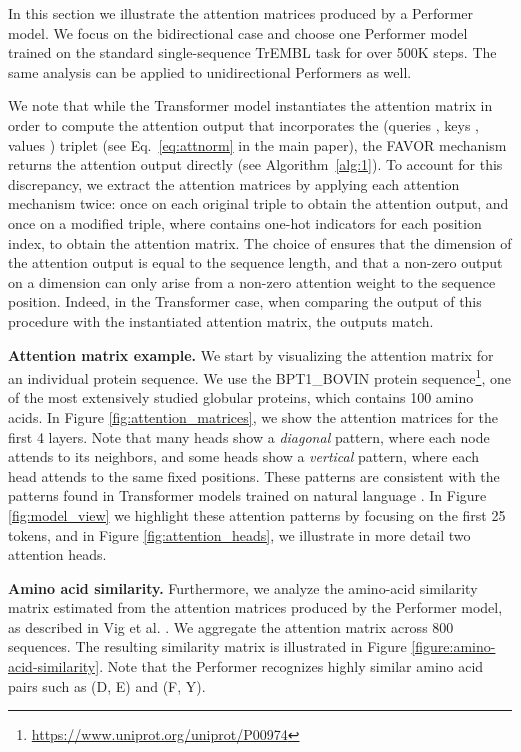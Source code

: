 In this section we illustrate the attention matrices produced by a Performer model. We focus on the bidirectional case and choose one Performer model trained on the standard single-sequence TrEMBL task for over 500K steps. The same analysis can be applied to unidirectional Performers as well.

We note that while the Transformer model instantiates the attention matrix in order to compute the attention output that incorporates the (queries , keys , values ) triplet (see Eq.~\ref{eq:attnorm} in the main paper), the FAVOR mechanism returns the attention output directly (see Algorithm~\ref{alg:1}). To account for this discrepancy, we extract the attention matrices by applying each attention mechanism twice: once on each original  triple to obtain the attention output, and once on a modified  triple, where  contains one-hot indicators for each position index, to obtain the attention matrix. The choice of  ensures that the dimension of the attention output is equal to the sequence length, and that a non-zero output on a dimension  can only arise from a non-zero attention weight to the  sequence position. Indeed, in the Transformer case, when comparing the output of this procedure with the instantiated attention matrix, the outputs match.

\textbf{Attention matrix example.} We start by visualizing the attention matrix for an individual protein sequence. We use the BPT1\_BOVIN protein sequence\footnote{\url{https://www.uniprot.org/uniprot/P00974}}, one of the most extensively studied globular proteins, which contains 100 amino acids. In Figure \ref{fig:attention_matrices}, we show the attention matrices for the first 4 layers. Note that many heads show a \textit{diagonal} pattern, where each node attends to its neighbors, and some heads show a \textit{vertical} pattern, where each head attends to the same fixed positions. These patterns are consistent with the patterns found in Transformer models trained on natural language \citep{kovaleva2019revealing}. In Figure \ref{fig:model_view} we highlight these attention patterns by focusing on the first 25 tokens, and in Figure \ref{fig:attention_heads}, we illustrate in more detail two attention heads.

\textbf{Amino acid similarity.} Furthermore, we analyze the amino-acid similarity matrix estimated from the attention matrices produced by the Performer model, as described in Vig et al. \citep{bertology}. We aggregate the attention matrix across 800 sequences. The resulting similarity matrix is illustrated in Figure \ref{figure:amino-acid-similarity}. Note that the Performer recognizes highly similar amino acid pairs such as (D, E) and (F, Y).


